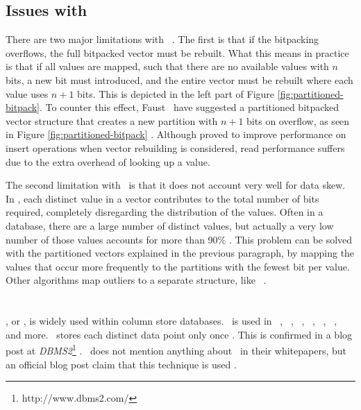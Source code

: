 \subsection{Issues with \bp}
\label{sub:Issues with Bitpacking}
There are two major limitations with \bp~\cite{Faust2015-ke}. The first is that if the bitpacking overflows, the full bitpacked vector must be rebuilt. What this means in practice is that if all values are mapped, such that there are no available values with $n$ bits, a new bit must introduced, and the entire vector must be rebuilt where each value uses $n + 1$ bits. This is depicted in the left part of Figure \ref{fig:partitioned-bitpack}. To counter this effect, Faust \ea~have suggested a partitioned bitpacked vector structure that creates a new partition with $n + 1$ bits on overflow, as seen in Figure \ref{fig:partitioned-bitpack} \cite{Faust2015-ke}. Although proved to improve performance on insert operations when vector rebuilding is considered, read performance suffers due to the extra overhead of looking up a value.

The second limitation with \bp~is that it does not account very well for data skew. In \bp, each distinct value in a vector contributes to the total number of bits required, completely disregarding the distribution of the values. Often in a database, there are a large number of distinct values, but actually a very low number of those values accounts for more than 90\% \cite{Faust2015-ke}. This problem can be solved with the partitioned vectors explained in the previous paragraph, by mapping the values that occur more frequently to the partitions with the fewest bit per value. Other algorithms map outliers to a separate structure, like \pfdelta~\cite{Bjorklund2011-wh}.

\section{\de}
\label{sec:Dictionary Encoding}
\de, or , is widely used within column store databases. \de~is used in \oracle~\cite{Lahiri2015-mz}, \ibm~\cite{Raman2013-em}, \saph~\cite{Farber2012-vh}, \sapnw~\cite{Lemke2010-is}, \blink~\cite{Johnson2008-cp}, \mssql~\cite{Larson2013-mc}, and more. \qlikview~stores each distinct data point only once \cite{Qlik2011-ef}. This is confirmed in a blog post at \textit{DBMS2}\footnote{http://www.dbms2.com/} \cite{noauthor_undated-js}. \tableau~does not mention anything about \de~in their whitepapers, but an official blog post claim that this technique is used \cite{noauthor_undated-us}.

